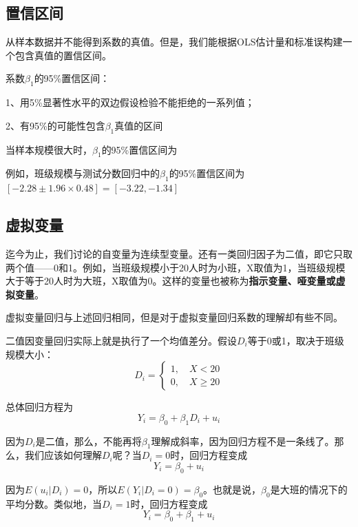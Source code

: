 \documentclass[cn,10pt,math=newtx,citestyle=gb7714-2015,bibstyle=gb7714-2015]{elegantbook}
\begin{document}
	\subsection{置信区间}
	从样本数据并不能得到系数的真值。但是，我们能根据OLS估计量和标准误构建一个包含真值的置信区间。
	
	系数$\beta_1$的95\%置信区间：
	
	1、用5\%显著性水平的双边假设检验不能拒绝的一系列值；
	
	2、有95\%的可能性包含$\beta_1$真值的区间
	
	当样本规模很大时，$\beta_1$的95\%置信区间为
	\begin{equation}
		[\hat{\beta}_1-1.96SE(\hat{\beta}_1),\hat{\beta}_1+1.96SE(\hat{\beta}_1)]
	\end{equation}
	
	例如，班级规模与测试分数回归中的$\beta_1$的95\%置信区间为$[-2.28\pm1.96\times0.48]=[-3.22,-1.34]$
	
	\subsection{虚拟变量}
	迄今为止，我们讨论的自变量为连续型变量。还有一类回归因子为二值，即它只取两个值——0和1。例如，当班级规模小于20人时为小班，X取值为1，当班级规模大于等于20人时为大班，X取值为0。这样的变量也被称为\textbf{指示变量、哑变量或虚拟变量}。
	
	虚拟变量回归与上述回归相同，但是对于虚拟变量回归系数的理解却有些不同。
	
	二值因变量回归实际上就是执行了一个均值差分。假设$D_i$等于0或1，取决于班级规模大小：
	\[ D_i=\begin{cases}
		1,\quad X<20 \\
		0,\quad X\geq20
	\end{cases} \]
	
	总体回归方程为
	\begin{equation}
		Y_i=\beta_0+\beta_1D_i+u_i
	\end{equation}
	
	因为$D_i$是二值，那么，不能再将$\beta_1$理解成斜率，因为回归方程不是一条线了。那么，我们应该如何理解$D_i$呢？当$D_i=0$时，回归方程变成
	\begin{equation}
		Y_i=\beta_0+u_i
	\end{equation}
	
	因为$E(u_i|D_i)=0$，所以$E(Y_i|D_i=0)=\beta_0$。也就是说，$\beta_0$是大班的情况下的平均分数。类似地，当$D_i=1$时，回归方程变成
	\begin{equation}
		Y_i=\beta_0+\beta_1+u_i
	\end{equation}
	
\end{document}
